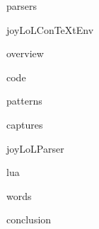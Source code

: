 
\usemodule[t-diSimp]

\startDiSimpComponent parsers

\diSimpEnvironment joyLoLConTeXtEnv

\startJoyLoLCoAlg[title=Parsers][parsers]

\diSimpComponent overview

\diSimpComponent code

\diSimpComponent patterns

\diSimpComponent captures

\diSimpComponent joyLoLParser

\diSimpComponent lua

\diSimpComponent words

\diSimpComponent conclusion

\stopJoyLoLCoAlg

\stopDiSimpComponent
